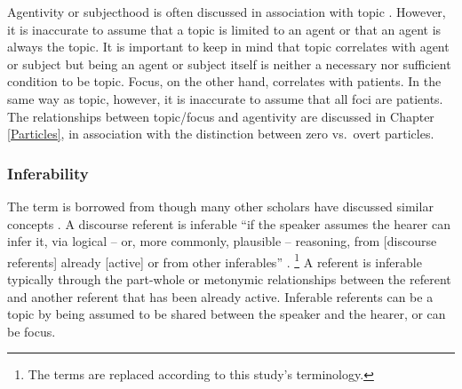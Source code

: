 Agentivity or subjecthood is often discussed in association with topic \cite[][inter alia]{li76}.
However, it is inaccurate to assume that a topic is limited to an agent
or that an agent is always the topic.
It is important to keep in mind that
topic correlates with agent or subject
but being an agent or subject itself is neither a necessary nor sufficient condition to be topic.
Focus, on the other hand, correlates with patients.
In the same way as topic, however,
it is inaccurate to assume that all foci are patients.
The relationships between topic/focus and agentivity are discussed in Chapter \ref{Particles},
in association with the distinction between zero vs.\ overt particles.


\subsubsection{Inferability}


The term  is borrowed from 
though many other scholars have discussed similar concepts \cite[e.g.,][]{havilandclark74,chafe94}.
A discourse referent is inferable
``if the speaker assumes the hearer can infer it, via logical --  or, more commonly, plausible -- reasoning, from [discourse referents] already [active] or from other inferables'' \cite[][p.\ 236]{prince81}.%
	\footnote{
	The terms are replaced according to this study's terminology.
	}
A referent is inferable typically through
the part-whole or metonymic relationships between the referent and another referent that has been already active.
Inferable referents can be a topic
by being assumed to be shared between the speaker and the hearer,
or can be focus.



%
%

